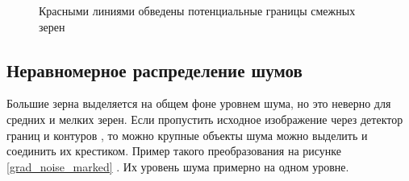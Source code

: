 \documentclass[a4paper, 14pt]{article}
\begin{document}
	 \begin{figure}[h]
	 	\caption{Красными линиями обведены потенциальные границы смежных зерен}
	 	\label{marked}
	 \end{figure}
	 
	 
		
	\subsection{Неравномерное распределение шумов} 
	Большие зерна выделяется на общем фоне уровнем шума, но это неверно для средних и мелких зерен. Если пропустить исходное изображение через детектор границ и контуров \cite{last}, то можно крупные объекты шума можно выделить и соединить их крестиком. Пример такого преобразования  на рисунке \ref{grad_noise_marked} . Их уровень шума примерно на одном уровне.
\end{document}
